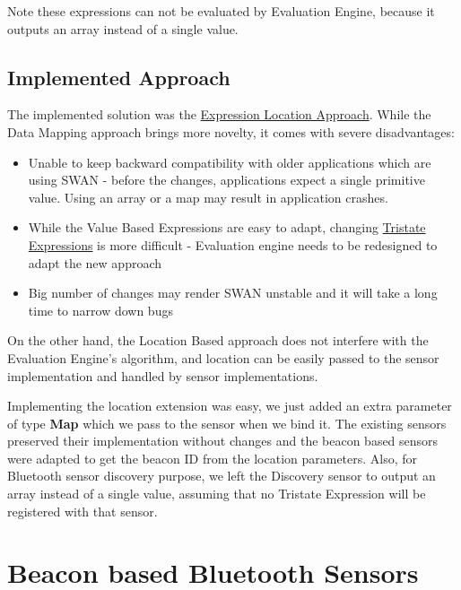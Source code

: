 Note these expressions can not be evaluated by Evaluation Engine, because it outputs an array instead of a single value.


\subsection{Implemented Approach}
The implemented solution was the \hyperref[sssec:exprlocation]{Expression Location Approach}.
While the Data Mapping approach brings more novelty, it comes with severe disadvantages:
\begin{itemize}
 \item Unable to keep backward compatibility with older applications which are using SWAN - before the changes, applications
 expect a single primitive value. Using an array or a map may result in application crashes.
 \item While the Value Based Expressions are easy to adapt, changing \hyperref[swan_song_expressions]{Tristate Expressions} is more difficult - Evaluation engine needs to be redesigned to adapt the new approach
 \item Big number of changes may render SWAN unstable and it will take a long time to narrow down bugs
\end{itemize}

On the other hand, the Location Based approach does not interfere with the Evaluation Engine's algorithm, and location can be easily passed to the sensor implementation and 
handled by sensor implementations. 

Implementing the location extension was easy, we just added an extra parameter of type \textbf{Map} which we pass to the sensor
when we bind it.
The existing sensors preserved their implementation without changes and the beacon based sensors were adapted to get the beacon ID from the location parameters.
Also, for Bluetooth sensor discovery purpose, we left the Discovery sensor to output an array instead of a single value, assuming that no Tristate Expression will be registered with that 
sensor.

\section{Beacon based Bluetooth Sensors}

